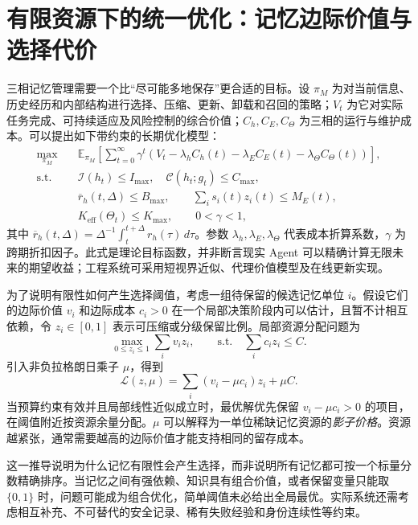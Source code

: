 \section{有限资源下的统一优化：记忆边际价值与选择代价}
\label{sec:memory-optimization}

三相记忆管理需要一个比“尽可能多地保存”更合适的目标。设 $\pi_M$ 为对当前信息、历史经历和内部结构进行选择、压缩、更新、卸载和召回的策略；$V_t$ 为它对实际任务完成、可持续适应及风险控制的综合价值；$C_h,C_E,C_{\Theta}$ 为三相的运行与维护成本。可以提出如下带约束的长期优化模型：
\begin{equation}
\label{eq:memory-utility}
\boxed{\begin{aligned}
 \max_{\pi_M}\quad &\mathbb E_{\pi_M}\!\left[\sum_{t=0}^{\infty}\gamma^t
 \left(V_t-\lambda_h C_h(t)-\lambda_E C_E(t)-\lambda_{\Theta}C_{\Theta}(t)\right)\right],\\
 \text{s.t.}\quad &\mathcal I(h_t)\le I_{\max},\quad \mathcal C(h_t;g_t)\le C_{\max},\\
 &\overline r_h(t,\Delta)\le B_{\max},\qquad \sum_i s_i(t)z_i(t)\le M_E(t),\\
 &K_{\mathrm{eff}}(\Theta_t)\le K_{\max},\qquad 0<\gamma<1,
\end{aligned}}
\end{equation}
其中 $\overline r_h(t,\Delta)=\Delta^{-1}\int_t^{t+\Delta}r_h(\tau)\,d\tau$。参数 $\lambda_h,\lambda_E,\lambda_{\Theta}$ 代表成本折算系数，$\gamma$ 为跨期折扣因子。此式是理论目标函数，并非断言现实 Agent 可以精确计算无限未来的期望收益；工程系统可采用短视界近似、代理价值模型及在线更新实现。

为了说明有限性如何产生选择阈值，考虑一组待保留的候选记忆单位 $i$。假设它们的边际价值 $v_i$ 和边际成本 $c_i>0$ 在一个局部决策阶段内可以估计，且暂不计相互依赖，令 $z_i\in[0,1]$ 表示可压缩或分级保留比例。局部资源分配问题为
\begin{equation}
\label{eq:knapsack-relaxation}
 \max_{0\le z_i\le1}\sum_i v_i z_i,
 \qquad \text{s.t.}\quad \sum_i c_i z_i\le C.
\end{equation}
引入非负拉格朗日乘子 $\mu$，得到
\begin{equation}
 \mathcal L(z,\mu)=\sum_i (v_i-\mu c_i)z_i+\mu C.
\end{equation}
当预算约束有效并且局部线性近似成立时，最优解优先保留 $v_i-\mu c_i>0$ 的项目，在阈值附近按资源余量分配。$\mu$ 可以解释为一单位稀缺记忆资源的\emph{影子价格}。资源越紧张，通常需要越高的边际价值才能支持相同的留存成本。

这一推导说明为什么记忆有限性会产生选择，而非说明所有记忆都可按一个标量分数精确排序。当记忆之间有强依赖、知识具有组合价值，或者保留变量只能取 $\{0,1\}$ 时，问题可能成为组合优化，简单阈值未必给出全局最优。实际系统还需考虑相互补充、不可替代的安全记录、稀有失败经验和身份连续性等约束。

